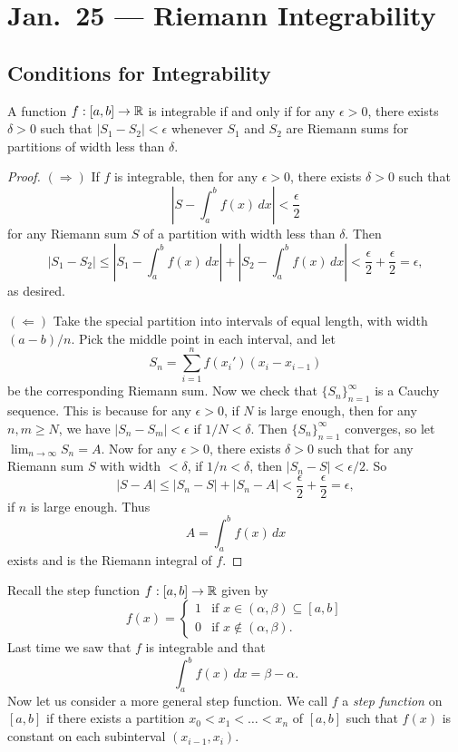 \chapter{Jan.~25 --- Riemann Integrability}

\section{Conditions for Integrability}
\begin{lemma}
  \label{lem:first-integrable}
  A function $f : [a, b] \to \mathbb{R}$ is integrable if and only if
  for any $\epsilon > 0$, there exists $\delta > 0$
  such that $|S_1 - S_2| < \epsilon$ whenever $S_1$
  and $S_2$ are Riemann sums for partitions of
  width less than $\delta$.
\end{lemma}

\begin{proof}
  $(\Rightarrow)$ If $f$ is integrable, then for
  any $\epsilon > 0$, there exists $\delta > 0$ such that
  \[
    \left|S - \int_a^b f(x)\, dx\right| < \frac{\epsilon}{2}
  \]
  for any Riemann sum $S$ of a partition with width
  less than $\delta$. Then
  \[
    |S_1 - S_2| \le
    \left|S_1 - \int_a^b f(x)\, dx\right| +
    \left|S_2 - \int_a^b f(x)\, dx\right| <
    \frac{\epsilon}{2} + \frac{\epsilon}{2} = \epsilon,
  \]
  as desired.

  $(\Leftarrow)$ Take the special partition into intervals
  of equal length, with width $(a - b) / n$. Pick
  the middle point in each interval, and let
  \[
    S_n = \sum_{i = 1}^n f(x_i') (x_i - x_{i - 1})
  \]
  be the corresponding Riemann sum. Now we check that
  $\{S_n\}_{n = 1}^\infty$ is a Cauchy sequence. This is
  because for any $\epsilon > 0$, if $N$ is large
  enough, then for any $n, m \ge N$, we have
  $|S_n - S_m| < \epsilon$ if $1 / N < \delta$. Then
  $\{S_n\}_{n = 1}^\infty$ converges, so let
  $\lim_{n \to \infty} S_n = A$. Now for any
  $\epsilon > 0$, there exists $\delta > 0$ such that
  for any Riemann sum $S$ with width $< \delta$,
  if $1 / n < \delta$, then $|S_n - S| < \epsilon / 2$.
  So
  \[
    |S - A| \le |S_n - S| + |S_n - A|
    < \frac{\epsilon}{2} + \frac{\epsilon}{2} = \epsilon,
  \]
  if $n$ is large enough. Thus
  \[
    A = \int_a^b f(x)\, dx
  \]
  exists and is the Riemann integral of $f$.
\end{proof}

\begin{remark}
Recall the step function $f : [a, b] \to \mathbb{R}$ given by
\[
  f(x) =
  \begin{cases}
    1 & \text{if } x \in (\alpha, \beta) \subseteq [a, b] \\
    0 & \text{if } x \notin (\alpha, \beta).
  \end{cases}
\]
Last time we saw that $f$ is integrable and that
\[
  \int_a^b f(x)\, dx = \beta - \alpha.
\]
Now let us consider a more general step function. We
call $f$ a \emph{step function} on $[a, b]$ if there
exists
a partition $x_0 < x_1 < \dots < x_n$ of $[a, b]$ such
that $f(x)$ is constant on each subinterval
$(x_{i - 1}, x_i)$.
\end{remark}

